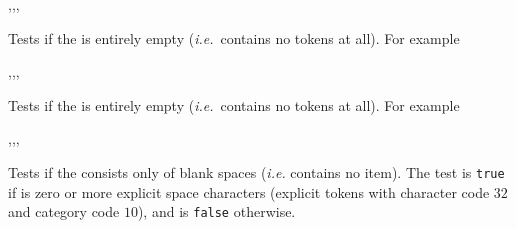 \documentclass[oneside]{book}
\begin{document}
\begin{function}{\TlIfEmpty,\TlIfEmptyT,\TlIfEmptyF,\TlIfEmptyTF}
\begin{syntax}
 
  
  
   
\end{syntax}
Tests if the  is entirely empty
(\emph{i.e.}~contains no tokens at all). For example
\begin{demohigh}
 {} {}
\TlIfEmptyTF {} {} {}
\end{demohigh}
\end{function}

\begin{function}{\TlVarIfEmpty,\TlVarIfEmptyT,\TlVarIfEmptyF,\TlVarIfEmptyTF}
\begin{syntax}
 
  
  
   
\end{syntax}
Tests if the  is entirely empty
(\emph{i.e.}~contains no tokens at all). For example
\begin{demohigh}
\TlSet {}
\TlVarIfEmptyTF {} {}
\TlClear \lTmpaTl
\TlVarIfEmptyTF {} {}
\end{demohigh}
\end{function}

\begin{function}{\TlIfBlank,\TlIfBlankT,\TlIfBlankF,\TlIfBlankTF}
\begin{syntax}
 
  
  
   
\end{syntax}
Tests if the  consists only of blank spaces
(\emph{i.e.} contains no item). The test is \texttt{true} if
 is zero or more explicit space characters
(explicit tokens with character code $32$ and category code $10$),
and is \texttt{false} otherwise.
\begin{demohigh}
\TlIfEmptyTF {  } {} {}
\TlIfBlankTF {  } {} {}
\end{demohigh}
\end{function}
\end{document}
